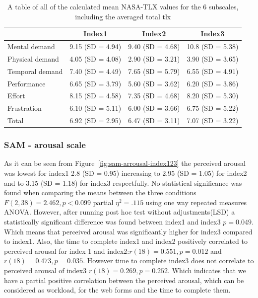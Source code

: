 \documentclass[a4paper]{report}
\begin{document}
				\begin{table}[h]
					\centering
					\caption[NASA-TLX mean scores]{A table of all of the calculated mean NASA-TLX values for the 6 subscales, including the averaged total tlx}
					\label{nasa-tlx}
					\begin{tabular}{l|ccc}
						& Index1           & Index2           & Index3           \\[0.12cm]   \hline
						Mental demand   & 9.15 (SD = 4.94) & 9.40 (SD = 4.68) & 10.8 (SD = 5.38) \\
						Physical demand & 4.05 (SD = 4.08) & 2.90 (SD = 3.21) & 3.90 (SD = 3.65) \\
						Temporal demand & 7.40 (SD = 4.49)  & 7.65 (SD = 5.79) & 6.55 (SD = 4.91) \\
						Performance     & 6.65 (SD = 3.79) & 5.60 (SD = 3.62)  & 6.20 (SD = 3.86)  \\
						Effort          & 8.15 (SD = 4.58) & 7.35 (SD = 4.68) & 8.20 (SD = 5.30)   \\
						Frustration     & 6.10 (SD = 5.11)  & 6.00 (SD = 3.66)  & 6.75 (SD = 5.22) \\\hline
						Total 			& 6.92 (SD = 2.95) & 6.47 (SD = 3.11) & 7.07 (SD = 3.22)
					\end{tabular}
				\end{table}
	
			\subsubsection{SAM - arousal scale}
			As it can be seen from Figure~\ref{fig:sam-arrousal-index123} the perceived arousal was lowest for index1 2.8 (SD = 0.95) increasing to 2.95 (SD = 1.05) for index2 and to 3.15 (SD = 1.18) for index3 respectfully. No statistical significance was found when comparing the means between the three conditions $F(2,38)=2.462, p<0.099$ partial $\eta^{2}=.115$ using one way repeated measures ANOVA. However, after running post hoc test without adjustments(LSD) a statistically significant difference was found between index1 and index3 $p=0.049$. Which means that perceived arousal was significantly higher for index3 compared to index1.
			Also, the time to complete index1 and index2 positively correlated to perceived arousal for index 1 and index2:$r(18)=0.551, p=0.012$ and $r(18)=0.473, p=0.035$. However time to complete index3 does not correlate to perceived arousal of index3 $r(18)=0.269, p=0.252$. Which indicates that we have a partial positive correlation between the perceived arousal, which can be considered as workload, for the web forms and the time to complete them.
			
\end{document}
